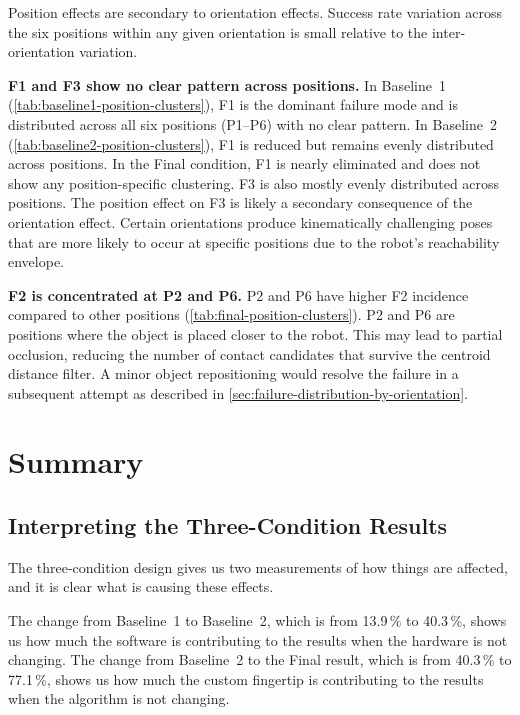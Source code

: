 \documentclass[oneside,studentpaper]{wbk}
\begin{document}
Position effects are secondary to orientation effects. Success rate variation across the six positions within any given orientation is small relative to the inter-orientation variation.

\textbf{F1 and F3 show no clear pattern across positions.} In Baseline~1 (\cref{tab:baseline1-position-clusters}), F1 is the dominant failure mode and is distributed across all six positions (P1--P6) with no clear pattern. In Baseline~2 (\cref{tab:baseline2-position-clusters}), F1 is reduced but remains evenly distributed across positions. In the Final condition, F1 is nearly eliminated and does not show any position-specific clustering. F3 is also mostly evenly distributed across positions. The position effect on F3 is likely a secondary consequence of the orientation effect. Certain orientations produce kinematically challenging poses that are more likely to occur at specific positions due to the robot's reachability envelope.

\textbf{F2 is concentrated at P2 and P6.} P2 and P6 have higher F2 incidence compared to other positions (\cref{tab:final-position-clusters}). P2 and P6 are positions where the object is placed closer to the robot. This may lead to partial occlusion, reducing the number of contact candidates that survive the centroid distance filter. A minor object repositioning would resolve the failure in a subsequent attempt as described in \cref{sec:failure-distribution-by-orientation}.

\section{Summary}
\label{sec:results-summary}

\subsection{Interpreting the Three-Condition Results}

The three-condition design gives us two measurements of how things are affected, and it is clear what is causing these effects.

The change from Baseline~1 to Baseline~2, which is from 13.9\,\% to 40.3\,\%, shows us how much the software is contributing to the results when the hardware is not changing. The change from Baseline~2 to the Final result, which is from 40.3\,\% to 77.1\,\%, shows us how much the custom fingertip is contributing to the results when the algorithm is not changing. 
\end{document}
